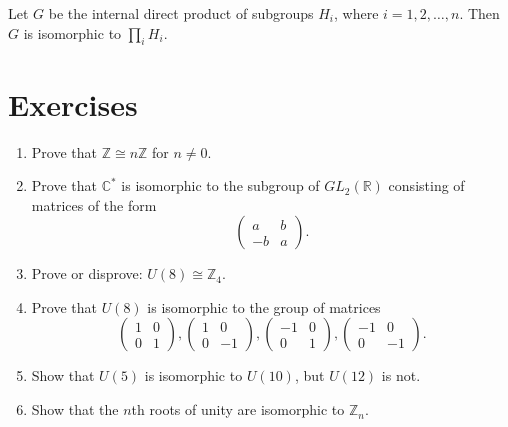 \begin{theorem}
Let $G$ be the internal direct product of subgroups $H_i$, where $i =
1, 2, \ldots, n$. Then $G$ is isomorphic to $\prod_i H_i$. 
\end{theorem}

 


 
\section*{Exercises}
\exrule

 
 
{\small
\begin{enumerate}
 
 
\item
Prove that ${\mathbb Z} \cong n{\mathbb Z}$ for $n \neq 0$.
 

\item
Prove that ${\mathbb C}^\ast$ is isomorphic to the subgroup of $GL_2(
{\mathbb R} )$ consisting of matrices of the form 
$$
\left(
\begin{array}{ccc}
a & b \\
-b & a
\end{array}
\right).
$$
 

\item
Prove or disprove: $U(8) \cong {\mathbb Z}_4$.
 

\item
Prove that $U(8)$ is isomorphic to the group of matrices
$$
\left(
\begin{array}{ccc}
1 & 0 \\
0 & 1
\end{array}
\right),
\left(
\begin{array}{ccc}
1 & 0 \\
0 & -1
\end{array}
\right),
\left(
\begin{array}{ccc}
-1 & 0 \\
0 & 1
\end{array}
\right),
\left(
\begin{array}{ccc}
-1 & 0 \\
0 & -1
\end{array}
\right).
$$
 

\item
Show that $U(5)$ is isomorphic to $U(10)$, but $U(12)$ is not.
 

\item
Show that the $n$th roots of unity are isomorphic to ${\mathbb Z}_n$. 
 


\end{enumerate}}
